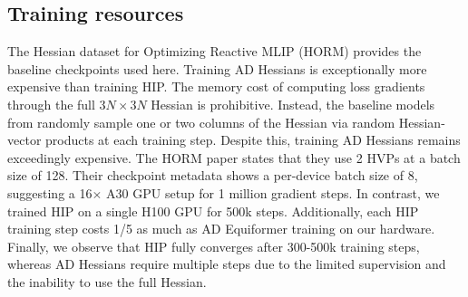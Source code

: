 \documentclass[pdflatex,sn-mathphys-num]{sn-jnl}%
\begin{document}
\begin{table}
\centering
{}
\caption{\textbf{Frequency-analysis classification by loss function.} True-positive rate (TPR), false-positive rate (FPR), false-negative rate (FNR), true-negative rate (TNR), precision and accuracy for identifying first-order transition states from the number of negative Hessian eigenvalues. Accuracy All is the accuracy for classifying any stationary-point type (minimum, first-order saddle or higher-order saddle). HIP-EquiformerV2 was trained with mean squared error (MSE), mean absolute error (MAE) or MAE plus subspace loss (MAE+Sub). Bold values mark the best result in each column. $n=1000$ HORM-T1x validation geometries. No inferential statistical test was applied.}
\label{tab:loss_freqanalysis}
\end{table}


\subsection{Training resources}
The Hessian dataset for Optimizing Reactive MLIP (HORM) provides the baseline checkpoints used here. Training AD Hessians is exceptionally more expensive than training HIP.
The memory cost of computing loss gradients through the full  $3N\times3N$ Hessian is prohibitive. Instead, the baseline models from \cite{cui2025horm} randomly sample one or two columns of the Hessian via random Hessian-vector products at each training step. Despite this, training AD Hessians remains exceedingly expensive. The HORM paper states that they use 2 HVPs at a batch size of 128. Their checkpoint metadata shows a per-device batch size of 8, suggesting a 16$\times$ A30 GPU setup for 1 million gradient steps.
In contrast, we trained HIP on a single H100 GPU for 500k steps. Additionally, each HIP training step costs 1/5 as much as AD Equiformer training on our hardware. Finally, we observe that HIP fully converges after 300-500k training steps, whereas AD Hessians require multiple steps due to the limited supervision and the inability to use the full Hessian.
\end{document}
